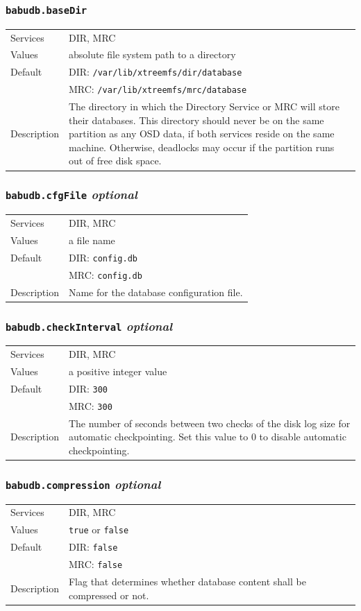 \documentclass[a4paper,10pt]{book}
\begin{document}
\subsubsection{\texttt{babudb.baseDir}}
\begin{tabular}{lp{10cm}}
 Services & DIR, MRC\\
 Values   & absolute file system path to a directory\\
 Default  & DIR: \texttt{/var/lib/xtreemfs/dir/database}\\
          & MRC: \texttt{/var/lib/xtreemfs/mrc/database}\\
 Description & The directory in which the Directory Service or MRC will store their databases. This directory should never be on the same partition as any OSD data, if both services reside on the same machine. Otherwise, deadlocks may occur if the partition runs out of free disk space.
\end{tabular}

\subsubsection{\texttt{babudb.cfgFile} \textit{optional}}
\begin{tabular}{lp{10cm}}
 Services & DIR, MRC\\
 Values   & a file name\\
 Default  & DIR: \texttt{config.db}\\
          & MRC: \texttt{config.db}\\
 Description & Name for the database configuration file.
\end{tabular}

\subsubsection{\texttt{babudb.checkInterval} \textit{optional}}
\begin{tabular}{lp{10cm}}
 Services & DIR, MRC\\
 Values   & a positive integer value\\
 Default  & DIR: \texttt{300}\\
          & MRC: \texttt{300}\\
 Description & The number of seconds between two checks of the disk log size for automatic checkpointing. Set this value to 0 to disable automatic checkpointing. 
\end{tabular}

\subsubsection{\texttt{babudb.compression} \textit{optional}}
\begin{tabular}{lp{10cm}}
 Services & DIR, MRC\\
 Values   & \texttt{true} or \texttt{false}\\
 Default  & DIR: \texttt{false}\\
          & MRC: \texttt{false}\\
 Description & Flag that determines whether database content shall be compressed or not.
\end{tabular}
\end{document}
